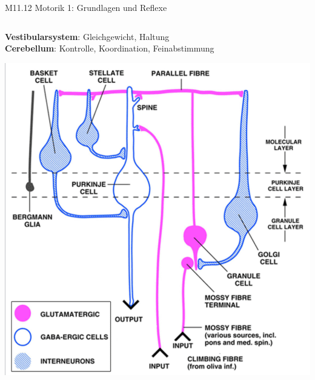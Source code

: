 \documentclass{beamer}
\begin{document}
\begin{frame}{M11.12 Motorik 1: Grundlagen und Reflexe}
\begin{columns}[c]
\begin{column}{5cm}
\textbf{Vestibularsystem}: Gleichgewicht, Haltung  \\


\textbf{Cerebellum}: Kontrolle, Koordination, Feinabstimmung \\

\pause

\begin{center}
    \includegraphics[width=\textwidth]{cerebellum_layers.png}
\end{center}

\end{column}


\end{columns}



\end{frame}





\end{document}
